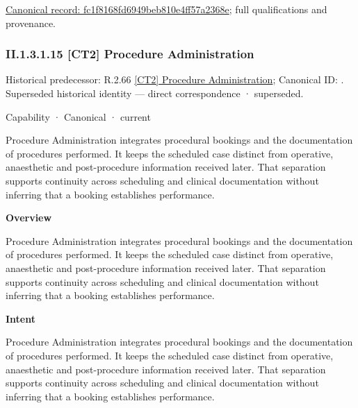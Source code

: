 {\footnotesize \href{../../../../../../../continuum/strategy/capability/feature/fc1f8168fd6949beb810e4ff57a2368e.md}{Canonical record: fc1f8168fd6949beb810e4ff57a2368e}; full qualifications and provenance.}\par
\subsubsection*{II.1.3.1.15 [CT2] Procedure Administration}
\label{navigation:II.1.3.1.15}

{\small Historical predecessor: R.2.66 \hyperref[element:466a4057001846bb8ae0481453d3e410]{[CT2] Procedure Administration}; Canonical ID: \texttt{}. Superseded historical identity — direct correspondence · superseded.}\par
\label{element:649dd7cc26094e539386a050086dfb91}
{\small Capability · Canonical · current}\par

Procedure Administration integrates procedural bookings and the documentation of procedures performed. It keeps the scheduled case distinct from operative, anaesthetic and post-procedure information received later. That separation supports continuity across scheduling and clinical documentation without inferring that a booking establishes performance.



\textbf{Overview}



Procedure Administration integrates procedural bookings and the documentation of procedures performed. It keeps the scheduled case distinct from operative, anaesthetic and post-procedure information received later. That separation supports continuity across scheduling and clinical documentation without inferring that a booking establishes performance.



\textbf{Intent}



Procedure Administration integrates procedural bookings and the documentation of procedures performed. It keeps the scheduled case distinct from operative, anaesthetic and post-procedure information received later. That separation supports continuity across scheduling and clinical documentation without inferring that a booking establishes performance.



